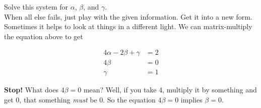 \documentclass{article}
\def\a{\alpha}
\def\b{\beta}
\def\c{\gamma}
\begin{document}
Solve this system for $\a$, $\b$, and $\c$.\\

When all else fails, just play with the given information. Get it into a new form. Sometimes it helps to look at things in a different light. We can matrix-multiply the equation above to get


\begin{align*}
4 \a - 2 \b + \c &= 2 \\
4 \b &= 0 \\
\c & = 1
\end{align*}

\textbf{Stop!} What does $4 \b = 0$ mean? Well, if you take 4, multiply it by something and get 0, that something \textit{must} be 0. So the equation $4 \b = 0$ implies $\b = 0$. 
\end{document}
